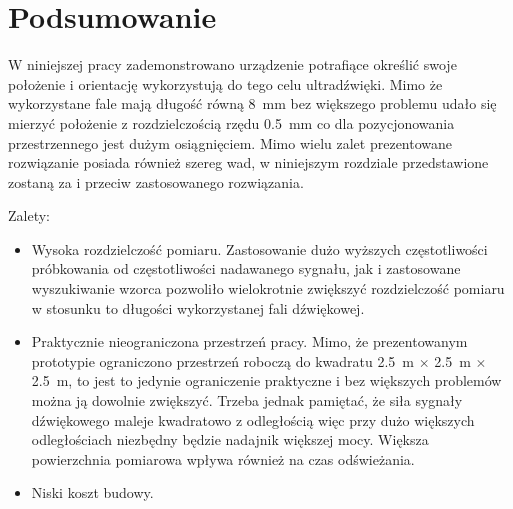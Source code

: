 \chapter{Podsumowanie}

W niniejszej pracy zademonstrowano urządzenie potrafiące określić swoje
położenie i orientację wykorzystują do tego celu ultradźwięki.
Mimo że wykorzystane fale mają długość równą \SI{8}{mm}  bez większego problemu
udało się mierzyć położenie z rozdzielczością rzędu \SI{0,5}{mm} co dla 
pozycjonowania przestrzennego jest dużym osiągnięciem.
Mimo wielu zalet prezentowane rozwiązanie posiada również szereg wad, w niniejszym rozdziale
przedstawione zostaną za i przeciw zastosowanego rozwiązania.

Zalety:
\begin{itemize}
 \item Wysoka rozdzielczość pomiaru. Zastosowanie dużo wyższych częstotliwości 
 próbkowania od częstotliwości nadawanego sygnału, jak i zastosowane wyszukiwanie wzorca pozwoliło
 wielokrotnie zwiększyć rozdzielczość pomiaru w stosunku to długości wykorzystanej fali dźwiękowej.
 
 \item Praktycznie nieograniczona przestrzeń pracy. Mimo, że prezentowanym prototypie
 ograniczono przestrzeń roboczą do kwadratu \SI{2,5}{m} $\times$ \SI{2,5}{m} $\times$ \SI{2,5}{m},
 to jest to jedynie ograniczenie praktyczne i bez większych problemów można ją dowolnie zwiększyć. Trzeba jednak 
 pamiętać, że siła sygnały dźwiękowego maleje kwadratowo z odległością więc przy dużo większych odległościach
 niezbędny będzie nadajnik większej mocy. Większa powierzchnia pomiarowa wpływa również na czas odświeżania.

 \item Niski koszt budowy. 
\end{itemize}

